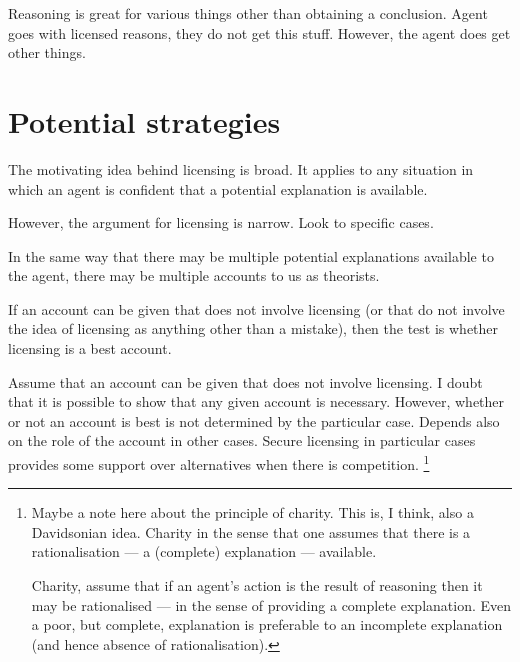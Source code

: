 \documentclass[10pt]{article}
\newcommand{\hozlinedash}[0]{%
  \noindent\hdashrule[0.5ex][c]{\textwidth}{.1pt}{2.5pt}
}
\begin{document}
Reasoning is great for various things other than obtaining a conclusion.
Agent goes with licensed reasons, they do not get this stuff.
However, the agent does get other things.





\hozlinedash

\section{Potential strategies}
\label{sec:potential-strategies}

\begin{note}
  The motivating idea behind licensing is broad.
  It applies to any situation in which an agent is confident that a potential explanation is available.

  However, the argument for licensing is narrow.
  Look to specific cases.

  In the same way that there may be multiple potential explanations available to the agent, there may be multiple accounts to us as theorists.

  If an account can be given that does not involve licensing (or that do not involve the idea of licensing as anything other than a mistake), then the test is whether licensing is a best account.

  Assume that an account can be given that does not involve licensing.
  I doubt that it is possible to show that any given account is necessary.
  However, whether or not an account is best is not determined by the particular case.
  Depends also on the role of the account in other cases.
  Secure licensing in particular cases provides some support over alternatives when there is competition.\nolinebreak
  \footnote{
    Maybe a note here about the principle of charity.
    This is, I think, also a Davidsonian idea.
    Charity in the sense that one assumes that there is a rationalisation --- a (complete) explanation --- available.

    Charity, assume that if an agent's action is the result of reasoning then it may be rationalised --- in the sense of providing a complete explanation.
    Even a poor, but complete, explanation is preferable to an incomplete explanation (and hence absence of rationalisation).


}
\end{note}
\end{document}
